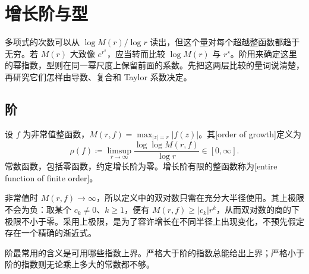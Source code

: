 \section{增长阶与型}
\label{b3:sec:1902}

多项式的次数可以从 \(\log M(r)/\log r\) 读出，但这个量对每个超越整函数都趋于无穷。若 \(M(r)\) 大致像 \(e^{r^s}\)，应当转而比较 \(\log M(r)\) 与 \(r^s\)。阶用来确定这里的幂指数，型则在同一幂尺度上保留前面的系数。先把这两层比较的量词说清楚，再研究它们怎样由导数、复合和 Taylor 系数决定。

\subsection{阶}
\label{b3:subsec:190201}

\begin{definition}\label{b3:def:19-order}
设 \(f\) 为非常值整函数，\(M(r,f)=\max_{|z|=r}|f(z)|\)。其[order of growth]定义为
\[
 \rho(f)\coloneqq\limsup_{r\to\infty}
 \frac{\log\log M(r,f)}{\log r}\in[0,\infty].
\]
常数函数，包括零函数，约定增长阶为零。增长阶有限的整函数称为[entire function of finite order]。
\end{definition}
非常值时 \(M(r,f)\to\infty\)，所以定义中的双对数只需在充分大半径使用。其上极限不会为负：取某个 \(c_k\ne0\)、\(k\ge1\)，便有 \(M(r,f)\ge|c_k|r^k\)，从而双对数的商的下极限不小于零。采用上极限，是为了容许增长在不同半径上出现变化，不预先假定存在一个精确的渐近式。

\ProseParagraphBreak

阶最常用的含义是可用哪些指数上界。严格大于阶的指数总能给出上界；严格小于阶的指数则无论乘上多大的常数都不够。

